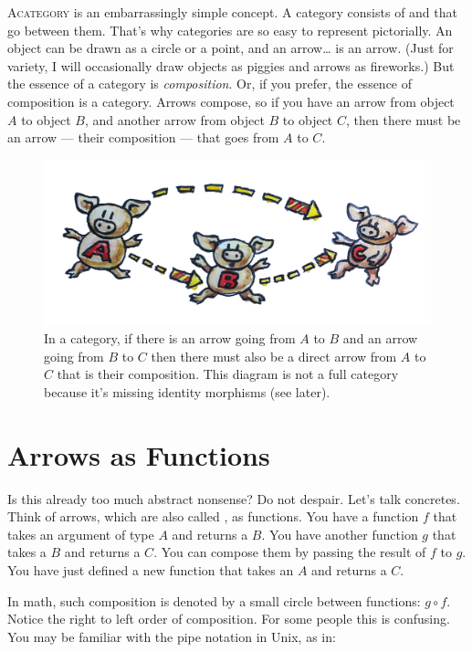 
\lettrine[lhang=0.17]{A}{category} is an embarrassingly simple concept.
A category consists of  and  that go between them. That's
why categories are so easy to represent pictorially. An object can be
drawn as a circle or a point, and an arrow\ldots{} is an arrow. (Just
for variety, I will occasionally draw objects as piggies and arrows as
fireworks.) But the essence of a category is \emph{composition}. Or, if you
prefer, the essence of composition is a category. Arrows compose, so
if you have an arrow from object $A$ to object $B$, and another arrow from
object $B$ to object $C$, then there must be an arrow --- their composition
--- that goes from $A$ to $C$.

\begin{figure}
\centering
\includegraphics[width=\textwidth]{images/img_1330.jpg}
\caption{In a category, if there is an arrow going from $A$ to $B$ and an arrow going from $B$ to $C$
then there must also be a direct arrow from $A$ to $C$ that is their composition. This diagram is not a full
category because it’s missing identity morphisms (see later).}
\end{figure}

\section{Arrows as Functions}

Is this already too much abstract nonsense? Do not despair. Let's talk
concretes. Think of arrows, which are also called , as
functions. You have a function $f$ that takes an argument of type $A$ and
returns a $B$. You have another function $g$ that takes a $B$ and returns a $C$.
You can compose them by passing the result of $f$ to $g$. You have just
defined a new function that takes an $A$ and returns a $C$.

In math, such composition is denoted by a small circle between
functions: $g \circ f$. Notice the right to left order of composition. For some
people this is confusing. You may be familiar with the pipe notation in
Unix, as in:

